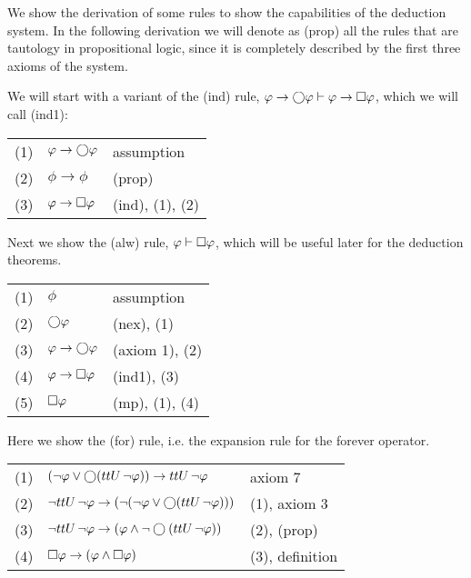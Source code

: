 \begin{example}\label{ex:alw}
  We show the derivation of some rules to show the capabilities of the deduction system.
  In the following derivation we will denote as (prop) all the rules that are tautology in propositional
  logic, since it is completely described by the first three axioms of the system.

  We will start with a variant of the (ind) rule, $\varphi \to \bigcirc{\varphi} \vdash \varphi \to \Box{\varphi}$, which we will call (ind1):

  \medskip
  \begin{tabularx}{300pt}{cXl}
    (1) & $\varphi \to \bigcirc{\varphi}$ & assumption \\
    (2) & $\phi \to \phi$ & (prop) \\
    (3) & $\varphi \to \Box{\varphi}$ & (ind), (1), (2)
  \end{tabularx}

  \medskip
  Next we show the (alw) rule, $\varphi \vdash \Box{\varphi}$, which will be useful later for the deduction theorems.

  \medskip
  \begin{tabularx}{300pt}{cXl}
    (1) & $\phi$ & assumption \\
    (2) & $\bigcirc{\varphi}$ & (nex), (1) \\
    (3) & $\varphi \to \bigcirc{\varphi}$ & (axiom 1), (2) \\
    (4) & $\varphi \to \Box{\varphi}$ & (ind1), (3) \\
    (5) & $\Box{\varphi}$ & (mp), (1), (4) \\
  \end{tabularx}

  \medskip
  Here we show the (for) rule, i.e. the expansion rule for the forever operator.

  \medskip
  \begin{tabularx}{300pt}{cXl}
    (1) & $(\neg\varphi \lor \bigcirc{({tt}U\,{\neg\varphi})}) \to {tt}U\,{\neg\varphi}$ & axiom 7 \\
    (2) & $\neg{tt}U\,{\neg\varphi} \to (\neg(\neg\varphi \lor \bigcirc{({tt}U\,{\neg\varphi})}))$ & (1), axiom 3 \\
    (3) & $\neg{tt}U\,{\neg\varphi} \to (\varphi \land \neg\bigcirc{({tt}U\,{\neg\varphi})})$ & (2), (prop) \\
    (4) & $\Box{\varphi} \to (\varphi \land \Box{\varphi})$ & (3), definition \\
  \end{tabularx}
\end{example}

